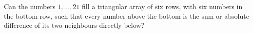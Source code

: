Can the numbers $1,\ldots,21$ fill a triangular array of six rows, with six numbers in the bottom row, such that every number above the bottom is the sum or absolute difference of its two neighbours directly below?
